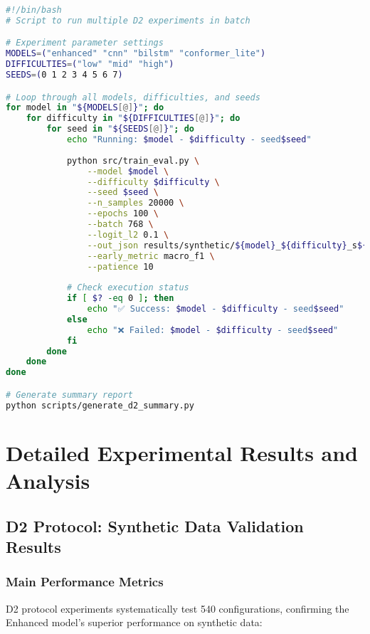 \begin{lstlisting}[language=bash,caption=D2 Protocol Batch Processing Script]
#!/bin/bash
# Script to run multiple D2 experiments in batch

# Experiment parameter settings
MODELS=("enhanced" "cnn" "bilstm" "conformer_lite")
DIFFICULTIES=("low" "mid" "high")
SEEDS=(0 1 2 3 4 5 6 7)

# Loop through all models, difficulties, and seeds
for model in "${MODELS[@]}"; do
    for difficulty in "${DIFFICULTIES[@]}"; do
        for seed in "${SEEDS[@]}"; do
            echo "Running: $model - $difficulty - seed$seed"
            
            python src/train_eval.py \
                --model $model \
                --difficulty $difficulty \
                --seed $seed \
                --n_samples 20000 \
                --epochs 100 \
                --batch 768 \
                --logit_l2 0.1 \
                --out_json results/synthetic/${model}_${difficulty}_s${seed}.json \
                --early_metric macro_f1 \
                --patience 10
                
            # Check execution status
            if [ $? -eq 0 ]; then
                echo "✅ Success: $model - $difficulty - seed$seed"
            else
                echo "❌ Failed: $model - $difficulty - seed$seed"
            fi
        done
    done
done

# Generate summary report
python scripts/generate_d2_summary.py
\end{lstlisting}

\section{Detailed Experimental Results and Analysis}
\label{sec:detailed_results}

\subsection{D2 Protocol: Synthetic Data Validation Results}
\label{subsec:d2_results}

\subsubsection{Main Performance Metrics}
D2 protocol experiments systematically test 540 configurations, confirming the Enhanced model's superior performance on synthetic data:

